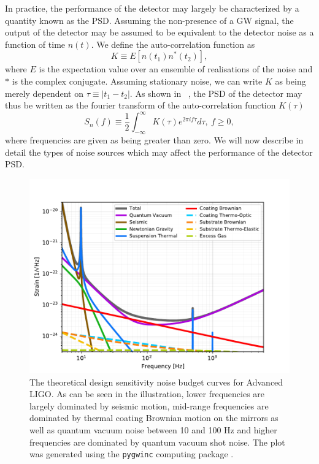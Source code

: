 %
%
In practice, the performance of the detector may largely be 
characterized by a quantity known as the \ac{PSD}. Assuming the non-presence of 
a \ac{GW} signal, the output of the detector may be assumed to be equivalent to the detector  
noise as a function of time $n(t)$. We define the auto-correlation 
function as 
%
\begin{equation}
    K \equiv E[n(t_1)n^{*}(t_2)],
\end{equation}
%
where $E$ is the expectation value over an ensemble of realisations of 
the noise and $*$ is the complex conjugate. 
Assuming stationary noise, we can write $K$ as being merely dependent 
on $\tau \equiv |t_1 - t_2|$. As shown in ~\cite{Sathyaprakash2009}, 
the \ac{PSD} 
of the detector may thus be written as the fourier transform of the 
auto-correlation function $K(\tau)$ 
%
\begin{equation}\label{eq:PSD}
    S_n(f) \equiv \frac{1}{2} \int_{-\infty}^{\infty} 
    K(\tau) e^{2\pi i f \tau} d\tau, \ f\geq0,
\end{equation}
%
where frequencies are given as being greater than zero. We will now describe 
in detail the types of noise sources which may affect the performance of 
the detector \ac{PSD}.

\begin{figure}
    \centering
    \includegraphics[width=\linewidth]{figures/aLIGO_noise_budget.pdf}
    \caption[Theoretical design sensitivity noise budget curves for Advanced \ac{LIGO}.]{The theoretical design sensitivity noise budget curves for Advanced \ac{LIGO}. As can be seen in the illustration, lower frequencies are largely dominated by seismic motion, mid-range frequencies are 
    dominated by thermal coating Brownian motion on the mirrors as well as quantum vacuum noise between 10 and 100 Hz and higher frequencies are 
    dominated by quantum vacuum shot noise. The plot was generated using the \texttt{pygwinc} computing package \cite{pygwinc}.}
    \label{fig:aligo_noise_budget}
\end{figure}

